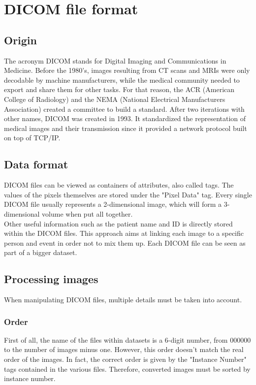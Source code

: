 \section{DICOM file format}
\label{sec:DICOM}
\subsection{Origin}
\setlength{\marginparwidth}{3cm}\leavevmode {}The acronym DICOM stands for Digital Imaging and Communications in Medicine. Before the 1980’s, images resulting from CT scans and MRIs were only decodable by machine manufacturers, while the medical community needed to export and share them for other tasks. For that reason, the ACR (American College of Radiology) and the NEMA (National Electrical Manufacturers Association) created a committee to build a standard. After two iterations with other names, DICOM was created in 1993. It standardized the representation of medical images and their transmission since it provided a network protocol built on top of TCP/IP.


\subsection{Data format}
\setlength{\marginparwidth}{3cm}\leavevmode {}DICOM files can be viewed as containers of attributes, also called tags. The values of the pixels themselves are stored under the "Pixel Data" tag. Every single DICOM file usually represents a 2-dimensional image, which will form a 3-dimensional volume when put all together.\\
Other useful information such as the patient name and ID is directly stored within the DICOM files. This approach aims at linking each image to a specific person and event in order not to mix them up. Each DICOM file can be seen as part of a bigger dataset. 


\subsection{Processing images}
\setlength{\marginparwidth}{3cm}\leavevmode {}When manipulating DICOM files, multiple details must be taken into account. 


\subsubsection{Order}
\setlength{\marginparwidth}{3cm}\leavevmode {}First of all, the name of the files within datasets is a 6-digit number, from 000000 to the number of images minus one. However, this order doesn’t match the real order of the images. In fact, the correct order is given by the "Instance Number" tags contained in the various files. Therefore, converted images must be sorted by instance number. 


